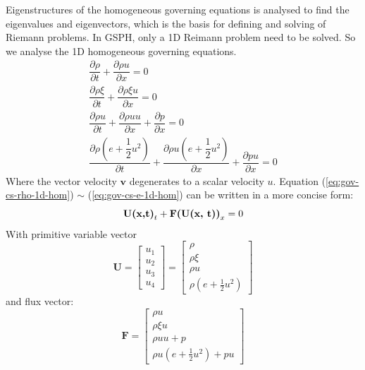 Eigenstructures of the homogeneous governing equations is analysed to find the eigenvalues and eigenvectors, which is the basis for defining and solving of Riemann problems. In GSPH, only a 1D Reimann problem need to be solved. So we analyse the 1D homogeneous governing equations. 
\begin{align}
\dfrac{\partial \rho}{\partial t} + \dfrac{\partial \rho u} {\partial x}= 0 \label{eq:gov-cs-rho-1d-hom} \\
\dfrac{\partial \rho \xi}{\partial t} + \dfrac{\partial \rho \xi u} {\partial x}= 0 \label{eq:gov-cs-ks-1d-hom}\\
\dfrac{\partial \rho u}{\partial t} + \dfrac{\partial \rho u u} {\partial x} + \dfrac{\partial p} {\partial x}= 0 \label{eq:gov-cs-v-1d-hom} \\
\dfrac{\partial \rho (e+\dfrac{1}{2}u^2)}{\partial t} + \dfrac{\partial \rho u (e+\dfrac{1}{2}u^2) } {\partial x} + \dfrac{\partial pu} {\partial x} = 0 \label{eq:gov-cs-e-1d-hom}
\end{align}
Where the vector velocity $\textbf{v}$ degenerates to a scalar velocity $u$. Equation (\ref{eq:gov-cs-rho-1d-hom}) $\sim$ (\ref{eq:gov-cs-e-1d-hom}) can be written in a more concise form:
\begin{equation}
\textbf{U(x,t)}_t + \textbf{F(\textbf{U}(x, t))}_x = 0
\end{equation}
With primitive variable vector
\begin{equation}
   \textbf{U}=\begin{bmatrix}
         u_1 \\
         u_2 \\
         u_3 \\
         u_4
     \end{bmatrix}
    =\begin{bmatrix}
         \rho \\
         \rho\xi \\
         \rho u   \\
         \rho(e+\frac{1}{2}u^2)
     \end{bmatrix}
\end{equation}
and flux vector: 
\begin{equation}
   \textbf{F}=\begin{bmatrix}
         \rho u \\
         \rho\xi u \\
         \rho u  u + p  \\
         \rho u(e+\frac{1}{2}u^2) + pu
     \end{bmatrix}
\end{equation}

